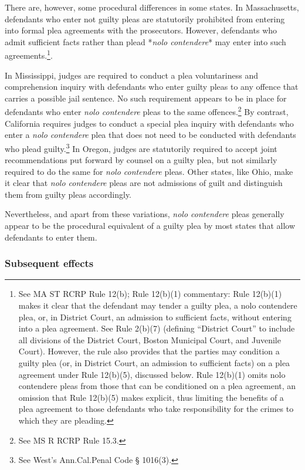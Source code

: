 There are, however, some procedural differences in some states. In Massachusetts, defendants who enter not guilty pleas are statutorily prohibited from entering into formal plea agreements with the prosecutors. However, defendants who admit sufficient facts rather than plead *\textit{nolo contendere}* may enter into such agreements.\footnote{See MA ST RCRP Rule 12(b); Rule 12(b)(1) commentary: Rule 12(b)(1) makes it clear that the defendant may tender a guilty plea, a nolo contendere plea, or, in District Court, an admission to sufficient facts, without entering into a plea agreement. See Rule 2(b)(7) (defining “District Court” to include all divisions of the District Court, Boston Municipal Court, and Juvenile Court). However, the rule also provides that the parties may condition a guilty plea (or, in District Court, an admission to sufficient facts) on a plea agreement under Rule 12(b)(5), discussed below. Rule 12(b)(1) omits nolo contendere pleas from those that can be conditioned on a plea agreement, an omission that Rule 12(b)(5) makes explicit, thus limiting the benefits of a plea agreement to those defendants who take responsibility for the crimes to which they are pleading.}.

In Mississippi, judges are required to conduct a plea voluntariness and comprehension inquiry with defendants who enter guilty pleas to any offence that carries a possible jail sentence. No such requirement appears to be in place for defendants who enter \textit{nolo contendere} pleas to the same offences.\footnote{See MS R RCRP Rule 15.3.} By contrast, California requires judges to conduct a special plea inquiry with defendants who enter a \textit{nolo contendere} plea that does not need to be conducted with defendants who plead guilty.\footnote{See West's Ann.Cal.Penal Code § 1016(3).} In Oregon, judges are statutorily required to accept joint recommendations put forward by counsel on a guilty plea, but not similarly required to do the same for \textit{nolo contendere} pleas. Other states, like Ohio, make it clear that \textit{nolo contendere} pleas are not admissions of guilt and distinguish them from guilty pleas accordingly. 

Nevertheless, and apart from these variations, \textit{nolo contendere} pleas generally appear to be the procedural equivalent of a guilty plea by most states that allow defendants to enter them. 

\subsubsection{Subsequent effects}

